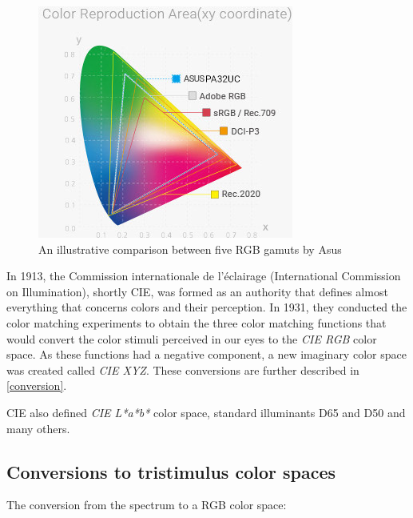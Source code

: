 \begin{figure}[h]
	\centering
	\includegraphics[width=0.6\linewidth]{img/gamut.jpg}
	\caption[ASUS RGB]{An illustrative comparison between five RGB gamuts by Asus \footnotemark}
	\label{fig:gamut}
\end{figure}

In 1913, the Commission internationale de l'éclairage (International Commission on Illumination), shortly CIE, was formed as an authority that defines almost everything that concerns colors and their perception. In 1931, they conducted the color matching experiments to obtain the three color matching functions that would convert the color stimuli perceived in our eyes to the \emph{CIE RGB} color space. As these functions had a negative component, a new imaginary color space was created called \emph{CIE XYZ}. These conversions are further described in \autoref{conversion}.

CIE also defined \emph{CIE L*a*b*} color space, standard illuminants D65 and D50 and many others.

\subsection{Conversions to tristimulus color spaces}
\label{conversion}

The conversion from the spectrum to a RGB color space:

